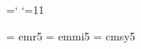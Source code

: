 
%
%
%
%
%	
%
%


\chardef\atcode=\catcode`\@	%
\catcode`\@=11			%


 \font\fivrm  = emr5		%
 \font\fivmi  = emmi5		%
    \skewchar{}	%
 \font\fivsy  = cmsy5		%
    \skewchar{}		%


